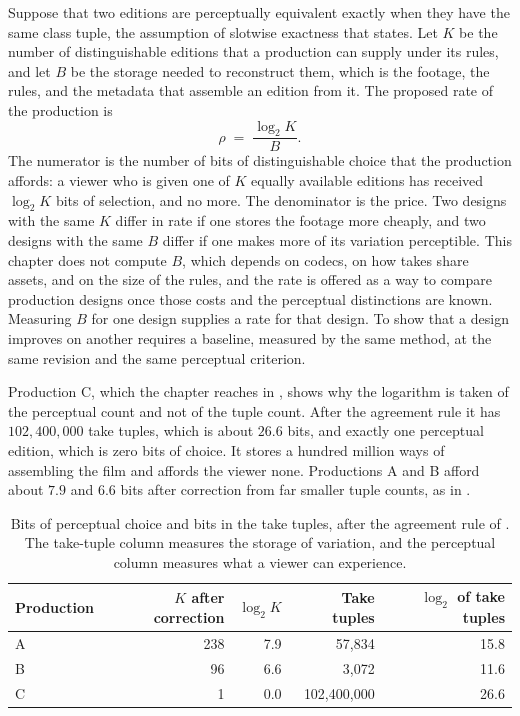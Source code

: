 \documentclass[11pt,twoside,openright]{book}
\theoremstyle{plain}
\theoremstyle{definition}
\theoremstyle{remark}
\begin{document}
Suppose that two editions are perceptually equivalent exactly when they have the same class tuple, the assumption of slotwise exactness that  states. Let $K$ be the number of distinguishable editions that a production can supply under its rules, and let $B$ be the storage needed to reconstruct them, which is the footage, the rules, and the metadata that assemble an edition from it. The proposed rate of the production is
\[
\rho \;=\; \frac{\log_2 K}{B}.
\]
The numerator is the number of bits of distinguishable choice that the production affords: a viewer who is given one of $K$ equally available editions has received $\log_2K$ bits of selection, and no more. The denominator is the price. Two designs with the same $K$ differ in rate if one stores the footage more cheaply, and two designs with the same $B$ differ if one makes more of its variation perceptible. This chapter does not compute $B$, which depends on codecs, on how takes share assets, and on the size of the rules, and the rate is offered as a way to compare production designs once those costs and the perceptual distinctions are known. Measuring $B$ for one design supplies a rate for that design. To show that a design improves on another requires a baseline, measured by the same method, at the same revision and the same perceptual criterion.

Production C, which the chapter reaches in , shows why the logarithm is taken of the perceptual count and not of the tuple count. After the agreement rule it has $102{,}400{,}000$ take tuples, which is about $26.6$ bits, and exactly one perceptual edition, which is zero bits of choice. It stores a hundred million ways of assembling the film and affords the viewer none. Productions A and B afford about $7.9$ and $6.6$ bits after correction from far smaller tuple counts, as in .

\begin{table}[ht]
\centering
\begin{tabular}{@{}lrrrr@{}}
\toprule
Production & $K$ after correction & $\log_2K$ & Take tuples & $\log_2$ of take tuples\\
\midrule
A & 238 & 7.9 & 57,834 & 15.8\\
B & 96 & 6.6 & 3,072 & 11.6\\
C & 1 & 0.0 & 102,400,000 & 26.6\\
\bottomrule
\end{tabular}
\caption{Bits of perceptual choice and bits in the take tuples, after the agreement rule of . The take-tuple column measures the storage of variation, and the perceptual column measures what a viewer can experience.}\label{tab:rate}
\end{table}
\end{document}
